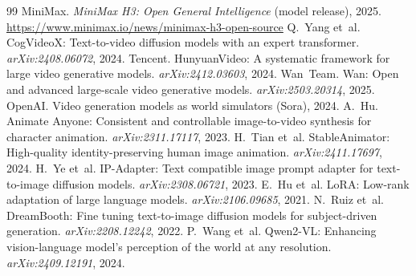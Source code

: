 \documentclass[10pt,twocolumn]{article}
\begin{document}

\begin{thebibliography}{99}
 MiniMax.
\newblock \emph{MiniMax H3: Open General Intelligence} (model release), 2025.
\newblock \url{https://www.minimax.io/news/minimax-h3-open-source}
 Q.~Yang et~al.
\newblock CogVideoX: Text-to-video diffusion models with an expert transformer.
\newblock \emph{arXiv:2408.06072}, 2024.
 Tencent.
\newblock HunyuanVideo: A systematic framework for large video generative models.
\newblock \emph{arXiv:2412.03603}, 2024.
 Wan~Team.
\newblock Wan: Open and advanced large-scale video generative models.
\newblock \emph{arXiv:2503.20314}, 2025.
 OpenAI.
\newblock Video generation models as world simulators (Sora), 2024.
 A.~Hu.
\newblock Animate Anyone: Consistent and controllable image-to-video synthesis for character
animation. \emph{arXiv:2311.17117}, 2023.
 H.~Tian et~al.
\newblock StableAnimator: High-quality identity-preserving human image animation.
\newblock \emph{arXiv:2411.17697}, 2024.
 H.~Ye et~al.
\newblock IP-Adapter: Text compatible image prompt adapter for text-to-image diffusion models.
\newblock \emph{arXiv:2308.06721}, 2023.
 E.~Hu et~al.
\newblock LoRA: Low-rank adaptation of large language models.
\newblock \emph{arXiv:2106.09685}, 2021.
 N.~Ruiz et~al.
\newblock DreamBooth: Fine tuning text-to-image diffusion models for subject-driven generation.
\newblock \emph{arXiv:2208.12242}, 2022.
 P.~Wang et~al.
\newblock Qwen2-VL: Enhancing vision-language model's perception of the world at any resolution.
\newblock \emph{arXiv:2409.12191}, 2024.
\end{thebibliography}
\end{document}
